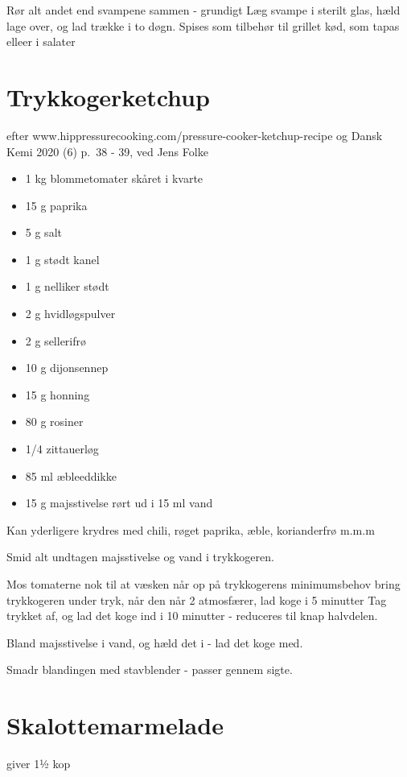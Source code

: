 \documentclass[
]{book}
\providecommand{\tightlist}{%
  \setlength{\itemsep}{0pt}\setlength{\parskip}{0pt}}
\begin{document}
Rør alt andet end svampene sammen - grundigt
Læg svampe i sterilt glas, hæld lage over, og lad trække i
to døgn. Spises som tilbehør til grillet kød, som tapas elleer
i salater

\section{Trykkogerketchup}\label{trykkogerketchup}

efter www.hippressurecooking.com/pressure-cooker-ketchup-recipe
og Dansk Kemi 2020 (6) p.~38 - 39, ved Jens Folke

\begin{itemize}
\tightlist
\item
  1 kg blommetomater skåret i kvarte
\item
  15 g paprika
\item
  5 g salt
\item
  1 g stødt kanel
\item
  1 g nelliker stødt
\item
  2 g hvidløgspulver
\item
  2 g sellerifrø
\item
  10 g dijonsennep
\item
  15 g honning
\item
  80 g rosiner
\item
  1/4 zittauerløg
\item
  85 ml æbleeddikke
\item
  15 g majsstivelse rørt ud i 15 ml vand
\end{itemize}

Kan yderligere krydres med chili, røget paprika, æble, korianderfrø
m.m.m

Smid alt undtagen majsstivelse og vand i trykkogeren.

Mos tomaterne nok til at væsken når op på trykkogerens minimumsbehov
bring trykkogeren under tryk, når den når 2 atmosfærer, lad koge i
5 minutter
Tag trykket af, og lad det koge ind i 10 minutter - reduceres til knap
halvdelen.

Bland majsstivelse i vand, og hæld det i - lad det koge med.

Smadr blandingen med stavblender - passer gennem sigte.

\section{Skalottemarmelade}\label{skalottemarmelade}

giver 1½ kop
\end{document}
